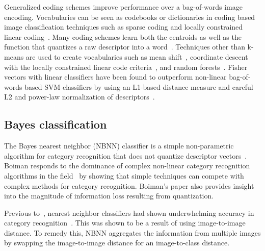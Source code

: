         Generalized coding schemes improve performance over a bag-of-words image encoding. Vocabularies can be seen
        as codebooks or dictionaries in coding based image classification techniques such as sparse coding and
        locally constrained linear coding~\cite{jurie_creating_2005, yang_linear_2009, yang_supervised_2010,
        yang_efficient_2010, wang_locality_constrained_2010}. Many coding schemes learn both the centroids as well
        as the function that quantizes a raw descriptor into a word~\cite{jurie_creating_2005, yang_linear_2009,
        yang_supervised_2010, yang_efficient_2010, wang_locality_constrained_2010, vedaldi_multiple_2009}.
        Techniques other than k-means are used to create vocabularies such as mean
        shift~\cite{jurie_creating_2005}, coordinate descent with the locally constrained linear code
        criteria~\cite{wang_locality_constrained_2010}, and random forests~\cite{perronnin_fisher_2007}. Fisher
        vectors with linear classifiers have been found to outperform non-linear bag-of-words based SVM classifiers
        by using an L1-based distance measure and careful L2 and power-law normalization of
        descriptors~\cite{perronnin_improving_2010, perronnin_large_scale_2010}.

    \subsection{\Naive{} Bayes classification}\label{sec:nbnn}  

        The \naive{} Bayes nearest neighbor (NBNN) classifier is a simple non-parametric algorithm for category
        recognition that does not quantize descriptor vectors~\cite{boiman_defense_2008}. Boiman responds to the
        dominance of complex non-linear category recognition algorithms in the field~\cite{varma_learning_2007,
        marszalek_learning_2007} by showing that simple techniques can compete with complex methods for category
        recognition. Boiman's paper also provides insight into the magnitude of information loss resulting from
        quantization.
          
        Previous to~\cite{boiman_defense_2008}, nearest neighbor classifiers had shown underwhelming accuracy in
        category recognition~\cite{varma_unifying_2004, lazebnik_beyond_2006, marszalek_learning_2007}. This was
        shown to be a result of using image-to-image distance. To remedy this, NBNN aggregates the information from
        multiple images by swapping the image-to-image distance for an image-to-class distance.

